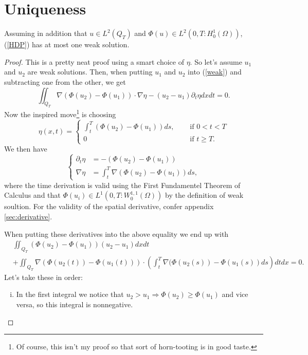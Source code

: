 \documentclass[11pt, a4paper]{article}
\begin{document}
\section{Uniqueness}
\begin{theorem}[Uniqueness]
	Assuming in addition that $u \in L^2(Q_T)$ and $\Phi(u) \in L^2(0,T : H_0^1(\Omega))$, (\ref{HDP}) has at most one weak solution.
\end{theorem}
\begin{proof}
This is a pretty neat proof using a smart choice of $\eta$. So let's assume $u_1$ and $u_2$ are weak solutions. Then, when putting $u_1$ and $u_2$ into (\ref{weak}) and subtracting one from the other, we get
\begin{equation}
\label{weak_diff}
\iint_{Q_T}\nabla(\Phi(u_2) - \Phi(u_1)) \cdot \nabla \eta - (u_2 - u_1)\partial_t \eta dxdt = 0.
\end{equation}
Now the inspired move\footnote{Of course, this isn't my proof so that sort of horn-tooting is in good taste.} is choosing
\begin{equation*}
\eta(x,t) = \begin{cases}
		\int_t^T(\Phi(u_2) - \Phi(u_1))ds, \quad &\text{ if } 0 < t < T \\
		0 \quad &\text{ if } t\geq T.
	\end{cases}
\end{equation*}
We then have
\begin{equation*}
\begin{cases}
	\partial_t \eta &= -(\Phi(u_2) - \Phi(u_1) ) \\
	\nabla \eta &= \int_t^T\nabla (\Phi(u_2) - \Phi(u_1))ds,
\end{cases}
\end{equation*}
where the time derivation is valid using the First Fundamentel Theorem of Calculus and that $\Phi(u_i) \in L^1(0,T : W_0^{1,1}(\Omega))$ by the definition of weak soultion. For the validity of the spatial derivative, confer appendix \ref{sec:derivative}.

When putting these derivatives into the above equality we end up with
\begin{equation}
\label{unique}
\begin{aligned}
	&\iint_{Q_T}(\Phi(u_2) - \Phi(u_1))(u_2 - u_1)dxdt \\ 
	&+ \iint_{Q_T}\nabla(\Phi(u_2(t)) - \Phi(u_1(t))) \cdot \left(\int_t^T 					\nabla(\Phi(u_2(s)) - \Phi(u_1(s))ds\right)dtdx = 0.
\end{aligned}
\end{equation}
Let's take these in order:
\begin{enumerate}[i)]
	\item In the first integral we notice that $u_2 > u_1 \Rightarrow \Phi(u_2) \geq \Phi(u_1)$ and vice versa, so this integral is nonnegative.
	

\end{enumerate}
\end{proof}
\end{document}

